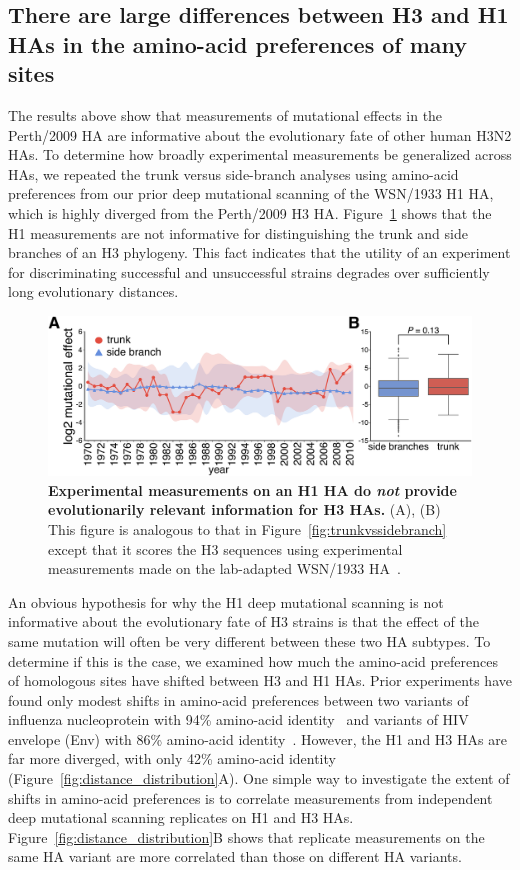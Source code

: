 \documentclass[9pt,twocolumn,twoside]{pnas-new}
\begin{document}
\subsection*{There are large differences between H3 and H1 HAs in the amino-acid preferences of many sites}
The results above show that measurements of mutational effects in the Perth/2009 HA are informative about the evolutionary fate of other human H3N2 HAs.
To determine how broadly experimental measurements be generalized across HAs, we repeated the trunk versus side-branch analyses using amino-acid preferences from our prior deep mutational scanning of the WSN/1933 H1 HA, which is highly diverged from the Perth/2009 H3 HA.
Figure~\ref{fig:WSN_trunkvssidebranch} shows that the H1 measurements are not informative for distinguishing the trunk and side branches of an H3 phylogeny.
This fact indicates that the utility of an experiment for discriminating successful and unsuccessful strains degrades over sufficiently long evolutionary distances. 

\begin{figure}
\centering
\includegraphics[width=\columnwidth]{figs/WSN_trunkvssidebranch/WSN_trunkvssidebranch.pdf}
\caption{\label{fig:WSN_trunkvssidebranch}
{\bf Experimental measurements on an H1 HA do \emph{not} provide evolutionarily relevant information for H3 HAs.}
(A), (B) This figure is analogous to that in Figure~\ref{fig:trunkvssidebranch} except that it scores the H3 sequences using experimental measurements made on the lab-adapted WSN/1933 HA~\cite{doud2016accurate}.
}
\end{figure}

An obvious hypothesis for why the H1 deep mutational scanning is not informative about the evolutionary fate of H3 strains is that the effect of the same mutation will often be very different between these two HA subtypes.
To determine if this is the case, we examined how much the amino-acid preferences of homologous sites have shifted between H3 and H1 HAs.
Prior experiments have found only modest shifts in amino-acid preferences between two variants of influenza nucleoprotein with 94\% amino-acid identity~\cite{doud2015site} and variants of HIV envelope (Env) with 86\% amino-acid identity~\cite{haddox2017mapping}.
However, the H1 and H3 HAs are far more diverged, with only 42\% amino-acid identity (Figure~\ref{fig:distance_distribution}A).
One simple way to investigate the extent of shifts in amino-acid preferences is to correlate measurements from independent deep mutational scanning replicates on H1 and H3 HAs.
Figure~\ref{fig:distance_distribution}B shows that replicate measurements on the same HA variant are more correlated than those on different HA variants.
\end{document}
